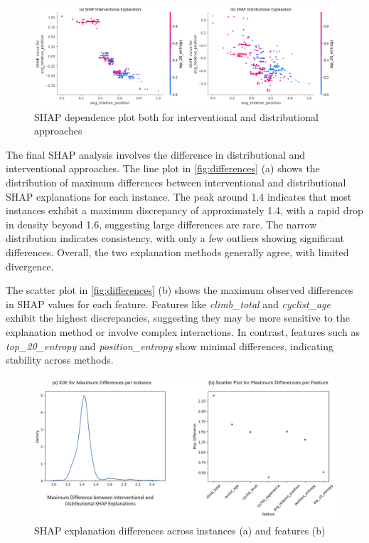 \begin{figure}[H]
    \centering
    \includegraphics[width=0.9\linewidth]{images//XAI/dependence_plot.png}
    \caption{\small SHAP dependence plot both for interventional and distributional approaches}
    \label{fig:dependence_plot}
\end{figure}

The final SHAP analysis involves the difference in distributional and interventional approaches. The line plot in \autoref{fig:differences} (a) shows the distribution of maximum differences between interventional and distributional SHAP explanations for each instance. The peak around 1.4 indicates that most instances exhibit a maximum discrepancy of approximately 1.4, with a rapid drop in density beyond 1.6, suggesting large differences are rare. The narrow distribution indicates consistency, with only a few outliers showing significant differences. Overall, the two explanation methods generally agree, with limited divergence. 

The scatter plot in \autoref{fig:differences} (b) shows the maximum observed differences in SHAP values for each feature. Features like \textit{climb\_total} and \textit{cyclist\_age} exhibit the highest discrepancies, suggesting they may be more sensitive to the explanation method or involve complex interactions. In contrast, features such as \textit{top\_20\_entropy} and \textit{position\_entropy} show minimal differences, indicating stability across methods.

\begin{figure}[H]
    \centering
    \includegraphics[width=0.8\linewidth]{images//XAI/differences.png}
    \vspace{-5pt}
    \caption{ \small SHAP explanation differences across instances (a) and features (b)}
    \label{fig:differences}
\end{figure}


